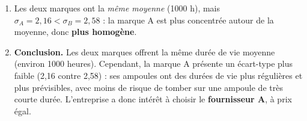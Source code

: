 \documentclass[11pt]{article}
\begin{document}
\begin{corrige}
\begin{enumerate}
\begin{center}
    \end{center}
    \item Les deux marques ont la \emph{même moyenne} (1000 h), mais $\sigma_A = 2{,}16 < \sigma_B = 2{,}58$ : la marque A est plus concentrée autour de la moyenne, donc \textbf{plus homogène}.
    \item \textbf{Conclusion.} Les deux marques offrent la même durée de vie moyenne (environ 1000 heures). Cependant, la marque A présente un écart-type plus faible (2,16 contre 2,58) : ses ampoules ont des durées de vie plus régulières et plus prévisibles, avec moins de risque de tomber sur une ampoule de très courte durée. L'entreprise a donc intérêt à choisir le \textbf{fournisseur A}, à prix égal.
\end{enumerate}
\end{corrige}
\end{document}
